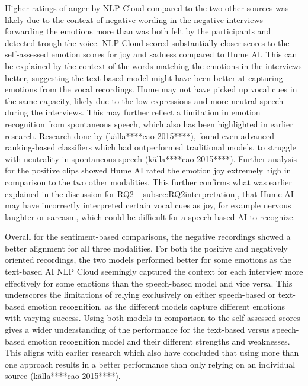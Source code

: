 Higher ratings of anger by NLP Cloud compared to the two other sources was likely due to the context of negative wording in the negative interviews forwarding the emotions more than was both felt by the participants and detected trough the voice.
NLP Cloud scored substantially closer scores to the self-assessed emotion scores for joy and sadness compared to Hume AI. This can be explained by the context of the words matching the emotions in the interviews better, suggesting the text-based model might have been better at capturing emotions from the vocal recordings. Hume may not have picked up vocal cues in the same capacity, likely due to the low expressions and more neutral speech during the interviews. This may further reflect a limitation in emotion recognition from spontaneous speech, which also has been highlighted in earlier research. Research done by (källa****cao 2015****), found even advanced ranking-based classifiers which had outperformed traditional models, to struggle with neutrality in spontaneous speech (källa****cao 2015****).
Further analysis for the positive clips showed Hume AI rated the emotion joy extremely high in comparison to the two other modalities. This further confirms what was earlier explained in the discussion for RQ2 ~\ref{subsec:RQ2interpretation}, that Hume AI may have incorrectly interpreted certain vocal cues as joy, for example nervous laughter or sarcasm, which could be difficult for a speech-based AI to recognize.

Overall for the sentiment-based comparisons, the negative recordings showed a better alignment for all three modalities. For both the positive and negatively oriented recordings, the two models performed better for some emotions as the text-based AI NLP Cloud seemingly captured the context for each interview more effectively for some emotions than the speech-based model and vice versa. This underscores the limitations of relying exclusively on either speech-based or text-based emotion recognition, as the different models capture different emotions with varying success. Using both models in comparison to the self-assessed scores gives a wider understanding of the performance for the text-based versus speech-based emotion recognition model and their different strengths and weaknesses. This aligns with earlier research which also have concluded that using more than one approach results in a better performance than only relying on an individual source (källa****cao 2015****).

